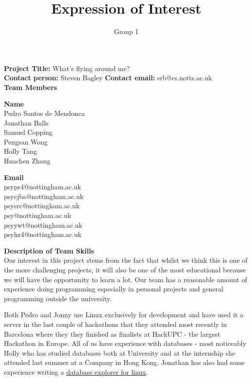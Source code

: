\documentclass[11pt, oneside]{article}
\title{Expression of Interest}
\author{Group 1}
\begin{document}
\maketitle
\textbf{Project Title: }What's flying around me?\\
\textbf{Contact person: }Steven Bagley\newline
\textbf{Contact email: }srb@cs.notts.ac.uk\\
    
\vspace{0.3cm}
\textbf{Team Members}\newline
\begin{minipage}[t]{0.5\textwidth}
    \textbf{Name}\\
    Pedro Santos de Mendonca\\
    Jonathan Balls\\
    Samuel Copping\\
    Pengsan Wong\\
    Holly Tang\\
    Huachen Zhang\\
\end{minipage}
\begin{minipage}[t]{0.5\textwidth}
    \textbf{Email}\\
    psyps4@nottingham.ac.uk \\
    psycjba@nottingham.ac.uk \\
    psysrc@nottingham.ac.uk \\
    psy@nottingham.ac.uk \\
    psyywt@nottingham.ac.uk \\
    psyhz4@nottingham.ac.uk \\
\end{minipage}

\textbf{Description of Team Skills}\\
Our interest in this project stems from the fact that whilst we think this is one of the more challenging projects, it will also be one of the most educational because we will have the opportunity to learn a lot. Our team has a reasonable amount of experience doing programming especially in personal projects and general programming outside the university.

Both Pedro and Jonny use Linux exclusively for development and have used it a server in the last couple of hackathons that they attended most recently in Barcelona where they they finished as finalists at HackUPC - the largest Hackathon in Europe. All of us have experience with databases - most noticeably Holly who has studied databases both at University and at the internship she attended last summer at a Company in Hong Kong. Jonathan has also had some experience writing a \href{https://github.com/bonniejools/dumbo}{database explorer for linux}.
\end{document}
